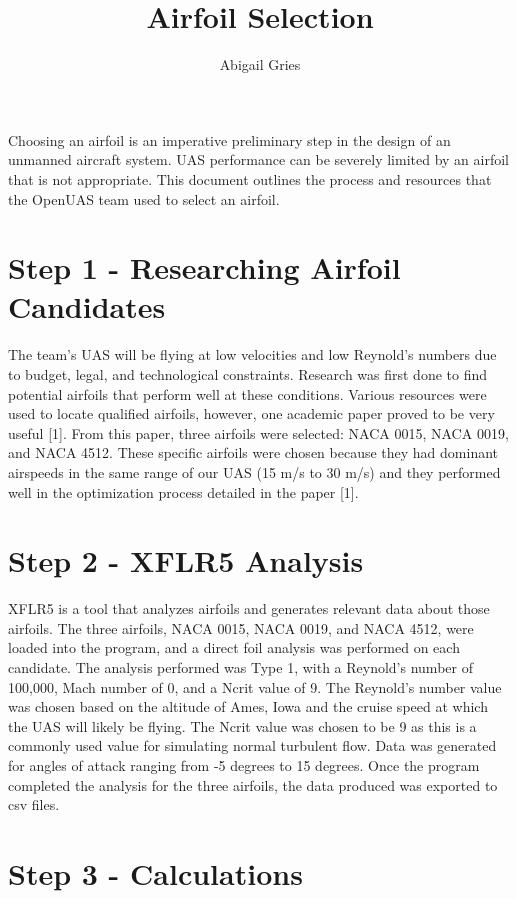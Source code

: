 \documentclass{article}
\begin{document}
\title{\textbf{Airfoil Selection}}
\author{Abigail Gries}
\maketitle

Choosing an airfoil is an imperative preliminary step in the design of an unmanned aircraft system. UAS performance can be severely limited by an airfoil that is not appropriate. This document outlines the process and resources that the OpenUAS team used to select an airfoil. 

\section*{Step 1 - Researching Airfoil Candidates}

The team's UAS will be flying at low velocities and low Reynold's numbers due to budget, legal, and technological constraints. Research was first done to find potential airfoils that perform well at these conditions. Various resources were used to locate qualified airfoils, however, one academic paper proved to be very useful [1]. From this paper, three airfoils were selected: NACA 0015, NACA 0019, and NACA 4512. These specific airfoils were chosen because they had dominant airspeeds in the same range of our UAS (15 m/s to 30 m/s) and they performed well in the optimization process detailed in the paper [1]. 

\section*{Step 2 - XFLR5 Analysis}

XFLR5 is a tool that analyzes airfoils and generates relevant data about those airfoils. The three airfoils, NACA 0015, NACA 0019, and NACA 4512, were loaded into the program, and a direct foil analysis was performed on each candidate. The analysis performed was Type 1, with a Reynold's number of 100,000, Mach number of 0, and a Ncrit value of 9. The Reynold's number value was chosen based on the altitude of Ames, Iowa and the cruise speed at which the UAS will likely be flying. The Ncrit value was chosen to be 9 as this is a commonly used value for simulating normal turbulent flow. Data was generated for angles of attack ranging from -5 degrees to 15 degrees. Once the program completed the analysis for the three airfoils, the data produced was exported to csv files. 

\section*{Step 3 - Calculations}
\end{document}
